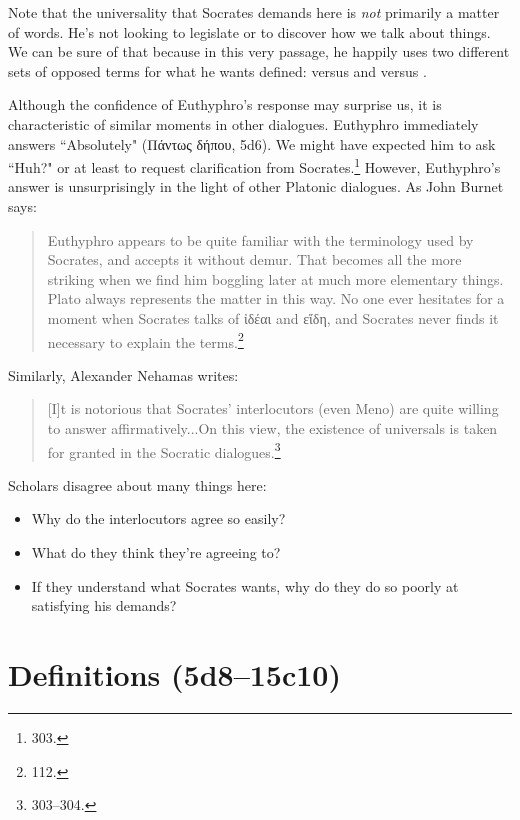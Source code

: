 \documentclass[11pt]{article}
\begin{document}
Note that the universality that Socrates demands here is \emph{not}
primarily a matter of words.  He's not looking to legislate or to discover
how we talk about things.  We can be sure of that because in this very
passage, he happily uses two different sets of opposed terms for what he
wants defined:  versus  and
 versus .

Although the confidence of Euthyphro's response may surprise us, it is
characteristic of similar moments in other dialogues.  Euthyphro immediately
answers ``Absolutely" (Πάντως δήπου, 5d6).  We might have expected him to
ask ``Huh?" or at least to request clarification from Socrates.\footnote
{\citet{nehamas1975} 303.}  However, Euthyphro's answer is unsurprisingly
in the light of other Platonic dialogues.  As John Burnet says:

\begin{quote}
    Euthyphro appears to be quite familiar with the terminology used by
    Socrates, and accepts it without demur.  That becomes all the more
    striking when we find him boggling later at much more elementary
    things.  Plato always represents the matter in this way.  No one ever
    hesitates for a moment when Socrates talks of ἰδέαι and εἴδη, and
    Socrates never finds it necessary to explain the terms.\footnote
    {\citet{burnet1924} 112.}
\end{quote}

Similarly, Alexander Nehamas writes:

\begin{quote}
    [I]t is notorious that Socrates' interlocutors (even Meno) are quite
    willing to answer affirmatively...On this view, the existence of
    universals is taken for granted in the Socratic dialogues.\footnote
    {\citet{nehamas1975} 303--304.}
\end{quote}

Scholars disagree about many things here:

\begin{itemize}
    \item Why do the interlocutors agree so easily?
    \item What do they think they're agreeing to?
    \item If they understand what Socrates wants, why do they do so poorly
        at satisfying his demands?
\end{itemize}

\section{Definitions (5d8--15c10)}
\end{document}
